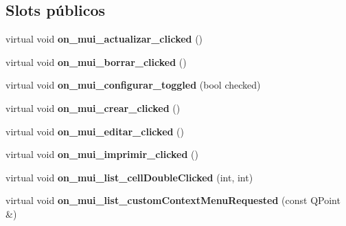 \subsection*{Slots p\'{u}blicos}
\begin{CompactItemize}
\item 
virtual void {\bf on\_\-mui\_\-actualizar\_\-clicked} ()\label{classCobrosList_i0}

\item 
virtual void {\bf on\_\-mui\_\-borrar\_\-clicked} ()\label{classCobrosList_i1}

\item 
virtual void {\bf on\_\-mui\_\-configurar\_\-toggled} (bool checked)\label{classCobrosList_i2}

\item 
virtual void {\bf on\_\-mui\_\-crear\_\-clicked} ()\label{classCobrosList_i3}

\item 
virtual void {\bf on\_\-mui\_\-editar\_\-clicked} ()\label{classCobrosList_i4}

\item 
virtual void {\bf on\_\-mui\_\-imprimir\_\-clicked} ()\label{classCobrosList_i5}

\item 
virtual void {\bf on\_\-mui\_\-list\_\-cell\-Double\-Clicked} (int, int)\label{classCobrosList_i6}

\item 
virtual void {\bf on\_\-mui\_\-list\_\-custom\-Context\-Menu\-Requested} (const QPoint \&)\label{classCobrosList_i7}

\end{CompactItemize}
